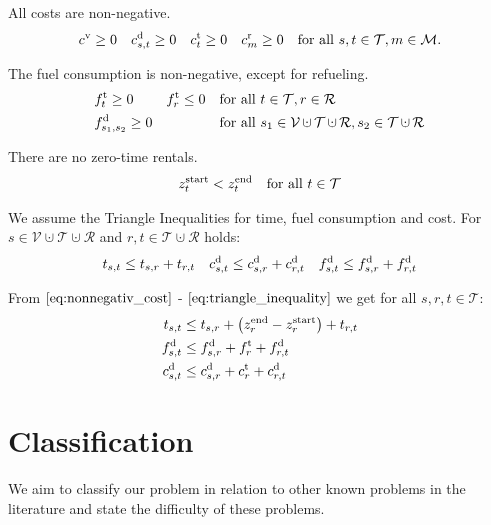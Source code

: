 All costs are non-negative.
\begin{align}
\label{eq:nonnegativ_cost}
	c^{\operatorname{v}}\geq 0 && c^{\operatorname{d}}_{s,t}\geq 0 && c^{\operatorname{t}}_t\geq 0 && c^{\operatorname{r}}_m\geq 0 && \text{for all } s,t\in\mathcal{T}, m\in\mathcal{M}.
\end{align}

The fuel consumption is non-negative, except for refueling.
\begin{align}
	& \ft_t\geq 0 && \ft_r\leq 0 && \text{for all } t\in\mathcal{T}, r\in\mathcal{R} \\
	& \fd_{s_1,s_2} \geq 0 &&&& \text{for all } s_1\in\mathcal{V}\cupdot\mathcal{T}\cupdot\mathcal{R},s_2\in\mathcal{T}\cupdot\mathcal{R}
\end{align}

There are no zero-time rentals.
\begin{align}
\label{eq:notime_trip}
	z^{\operatorname{start}}_t < z^{\operatorname{end}}_t && \text{for all } t\in\mathcal{T}
\end{align}

We assume the Triangle Inequalities for time, fuel consumption and cost. For $s\in\mathcal{V}\cupdot\mathcal{T}\cupdot\mathcal{R}$ and $r,t\in\mathcal{T}\cupdot\mathcal{R}$ holds:
\begin{align}
\label{eq:triangle_inequality}
	t_{s,t} \leq t_{s,r} + t_{r,t} && c^{\operatorname{d}}_{s,t} \leq c^{\operatorname{d}}_{s,r} + c^{\operatorname{d}}_{r,t} && f^{\operatorname{d}}_{s,t} \leq f^{\operatorname{d}}_{s,r} + f^{\operatorname{d}}_{r,t}
\end{align}

From $\eqref{eq:nonnegativ_cost}$ - $\eqref{eq:triangle_inequality}$ we get for all $s,r,t\in\mathcal{T}$:
\begin{align}
	t_{s,t} & \leq t_{s,r} + \left(z^{\operatorname{end}}_r - z^{\operatorname{start}}_r\right) + t_{r,t} \label{eq:triangle_inequality_time} \\
	f^{\operatorname{d}}_{s,t} & \leq f^{\operatorname{d}}_{s,r} + f^{\operatorname{t}}_{r} + f^{\operatorname{d}}_{r,t} \label{eq:triangle_inequality_fuel} \\
	c^{\operatorname{d}}_{s,t} & \leq c^{\operatorname{d}}_{s,r} + c^{\operatorname{t}}_{r} + c^{\operatorname{d}}_{r,t} \label{eq:triangle_inequality_cost}
\end{align}


\section{Classification}
\label{sec:classification}

We aim to classify our problem in relation to other known problems in the literature and state the difficulty of these problems.

